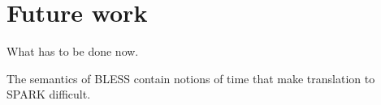 
\cleardoublepage


\chapter{Future work}
\label{future_work}

What has to be done now.

The semantics of BLESS contain notions of time that make translation to SPARK difficult.